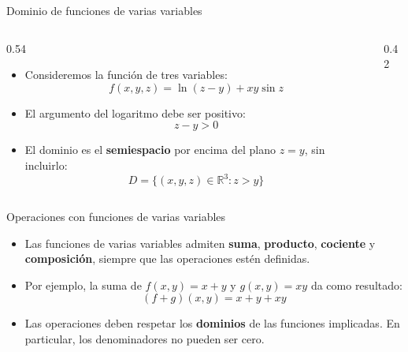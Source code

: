 \documentclass[main.tex]{subfiles}
\begin{document}
\begin{frame}{Dominio de funciones de varias variables}
  \begin{columns}[c,onlytextwidth]
    \begin{column}{0.54\textwidth}
      \begin{itemize}
        \item Consideremos la función de tres variables:
              \[
                f(x,y,z)=\ln(z-y)+xy\sin z
              \]

        \item El argumento del logaritmo debe ser positivo:
              \[
                z-y>0
              \]

        \item El dominio es el \textbf{semiespacio} por encima
              del plano $z=y$, sin incluirlo:
              \[
                D=\{(x,y,z)\in\mathbb{R}^3:z>y\}
              \]
      \end{itemize}
    \end{column}
    \begin{column}{0.42\textwidth}
      \centering
    \end{column}
  \end{columns}
\end{frame}

\begin{frame}{Operaciones con funciones de varias variables}
  \begin{itemize}
    \item Las funciones de varias variables admiten \textbf{suma},
          \textbf{producto}, \textbf{cociente} y \textbf{composición},
          siempre que las operaciones estén definidas.

    \item Por ejemplo, la suma de $f(x,y)=x+y$ y $g(x,y)=xy$
          da como resultado:
          \[
            (f+g)(x,y)=x+y+xy
          \]

    \item Las operaciones deben respetar los \textbf{dominios} de las
          funciones implicadas. En particular, los denominadores no
          pueden ser cero.
  \end{itemize}
\end{frame}
\end{document}
